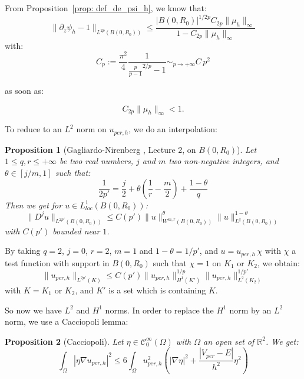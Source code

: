 \documentclass[leqno,11pt,letterpaper, english]{amsart}
\theoremstyle{plain}
\newtheorem{prop}{Proposition}[section]
\theoremstyle{definition}
\numberwithin{equation}{section}
\begin{document}
From Proposition~\ref{prop: def_de_psi_h}, we know that:
	\begin{equation}
		\label{eq: Ahlfors}
		\lVert \partial_z \psi_h-1 \lVert_{L^{2p}(B(0,R_0))}\leq \frac{|B(0,R_0)|^{1/2p}C_{2p} \lVert \mu_h \lVert_\infty}{1-C_{2p} \lVert \mu_h \lVert_\infty} 
	\end{equation}
with:
	\begin{equation}
		\label{eq:cstAhlfors}
		C_p:=\frac{\pi^2}{4}\frac{1}{\frac{p}{p-1}^{2/p}-1}\sim_{p \rightarrow +\infty}C\,p^2
	\end{equation}
	
as soon as:
	
	\begin{equation}
		\label{eq: condition_dutilisation_controle_mu}
		C_{2p} \lVert \mu_h \lVert_\infty <1.
	\end{equation}

To reduce to an $L^2$ norm on $u_{per,h}$, we do an interpolation:
\begin{prop}[Gagliardo-Nirenberg \cite{ASNSP_1959_3_13_2_115_0}, Lecture 2, on $B(0, R_0)$]
\label{prop: Gag-Nir}
Let $1 \leq q, r \leq +\infty$ be two real numbers, $j$ and $m$ two non-negative integers, and $\theta \in [j/m, 1]$ such that:
		\begin{equation}
			\frac{1}{2p'}= \frac{j}{2}+\theta \left(\frac{1}{r}-\frac{m}{2} \right)+\frac{1-\theta}{q}
		\end{equation}
Then we get for $u \in L_{loc}^1(B(0, R_0))$:
		\begin{equation}
			\lVert D^j u\lVert_{L^{2p'}(B(0,R_0))}\leq C(p')\lVert u\lVert_{W^{m,r}(B(0,R_0))}^{\theta}\lVert u\lVert_{L^q(B(0,R_0))}^{1-\theta} 
		\end{equation}
with $C(p')$ bounded near $1$.
\end{prop}
	
By taking $q=2$, $j=0$, $r=2$, $m=1$ and $1-\theta=1/p'$, and $u=u_{per,h}\,\chi$ with $\chi$ a test function with support in $B(0,R_0)$ such that $\chi=1$ on $K_1$ or $K_2$,  we obtain:
		\begin{equation}
		\lVert u_{per,h}\lVert_{L^{2p'}(K)}\leq C(p')\lVert u_{per,h}\lVert_{H^1(K')}^{1/p}\lVert u_{per,h}\lVert_{L^2(K_2)}^{1/p'} 
	\end{equation}
with $K = K_1$ or $K_2$, and $K'$ is a set which is containing $K$.

So now we have $L^2$ and $H^1$ norms. In order to replace the $H^1$ norm by an $L^2$ norm, we use a Cacciopoli lemma:
\begin{prop}[Cacciopoli]
\label{prop: Caccio}
Let $\eta \in \mathcal{C}_0^\infty(\Omega)$ with $\Omega$ an open set of $\mathbb{R}^2$. We get:
		\begin{equation}
			\int_{\Omega}|\eta\nabla u_{per,h}|^2 \leq 6\int_{\Omega}u_{per,h}^2 \left( |\nabla \eta|^2 + \frac{|V_{per}-E|}{h^2}\eta^2 \right)
		\end{equation}
\end{prop}
\end{document}
